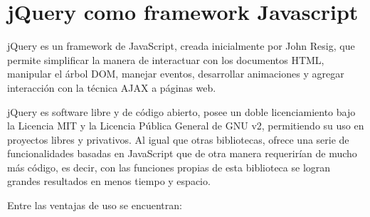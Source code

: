       
  


\section{jQuery como framework Javascript} %
  \label{sec:jquery_como_framework_javascript}

  jQuery es un framework de JavaScript, creada inicialmente por John Resig, que permite simplificar la manera de interactuar con los documentos HTML, manipular el árbol DOM, manejar eventos, desarrollar animaciones y agregar interacción con la técnica AJAX a páginas web.
  
  jQuery es software libre y de código abierto, posee un doble licenciamiento bajo la Licencia MIT y la Licencia Pública General de GNU v2, permitiendo su uso en proyectos libres y privativos. Al igual que otras bibliotecas, ofrece una serie de funcionalidades basadas en JavaScript que de otra manera requerirían de mucho más código, es decir, con las funciones propias de esta biblioteca se logran grandes resultados en menos tiempo y espacio.
  
  Entre las ventajas de uso se encuentran:
  
